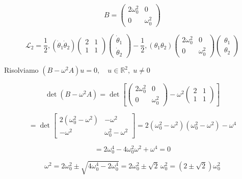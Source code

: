\begin{equation}
B=\begin{pmatrix}
2\omega_0^2 & 0\\
0 & \omega_0^2
\end{pmatrix}
\end{equation}

\begin{equation}
\mathcal{L}_2=\frac{1}{2},(\dot{\theta}_1\dot{\theta}_2)
\begin{pmatrix}2&1\\1&1\end{pmatrix}
\begin{pmatrix}\dot{\theta}_1\\ \dot{\theta}_2\end{pmatrix}
-\frac{1}{2},(\theta_1 \theta_2)
\begin{pmatrix}2\omega_0^2&0\\0&\omega_0^2\end{pmatrix}
\begin{pmatrix}\theta_1\\ \theta_2\end{pmatrix}
\end{equation}

Risolviamo $
(B - \omega^2 A)u = 0, \quad u \in \mathbb{R}^2, \; u \neq 0
$

\begin{equation*}
\det(B - \omega^2 A) = 
\det\left[\begin{pmatrix}
2\omega_0^2 & 0 \\
0 & \omega_0^2
\end{pmatrix}
- \omega^2 
\begin{pmatrix}
2 & 1 \\
1 & 1
\end{pmatrix}\right]
\end{equation*}

\begin{equation*}
= \det\begin{bmatrix}
2(\omega_0^2 - \omega^2) & -\omega^2 \\
-\omega^2 & \omega_0^2 - \omega^2
\end{bmatrix}
= 2(\omega_0^2 - \omega^2)(\omega_0^2 - \omega^2) - \omega^4
\end{equation*}

\begin{equation*}
= 2\omega_0^4 - 4\omega_0^2\omega^2 + \omega^4 = 0
\end{equation*}

\begin{equation*}
\omega^2 = 2\omega_0^2 \pm \sqrt{4\omega_0^4 - 2\omega_0^4} = 2\omega_0^2 \pm \sqrt{2}\,\omega_0^2 
= (2 \pm \sqrt{2}) \omega_0^2
\end{equation*}

